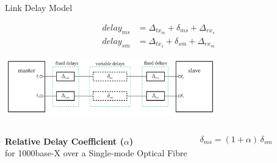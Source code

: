 \documentclass[compress,red]{beamer}
\begin{document}
\subsection{}
\begin{frame}{Link Delay Model}

  \begin{align}
    \nonumber delay_{ms} &= \Delta_{tx_m} + \delta_{ms} + \Delta_{rx_s} \\
    \nonumber delay_{sm} &= \Delta_{tx_s} + \delta_{sm} + \Delta_{rx_m}
  \end{align}

   \vspace{0.2cm}

  \begin{center}
  \includegraphics[height=2.5cm]{protocol/delaymodel.pdf}
  \end{center}

\begin{columns}[c]
  \column{2.8in}

    \begin{center}
      \textbf{Relative Delay Coefficient ($\alpha$)} \\
      for 1000base-X over a Single-mode Optical Fibre
    \end{center}

  \column{1.5in}
    \begin{center}
      \begin{equation}
      \nonumber \delta_{ms} = (1 + \alpha) \, \delta_{sm}
      \end{equation}
    \end{center}
    \vspace{0.5cm}
\end{columns}
  

\end{frame}
\end{document}
